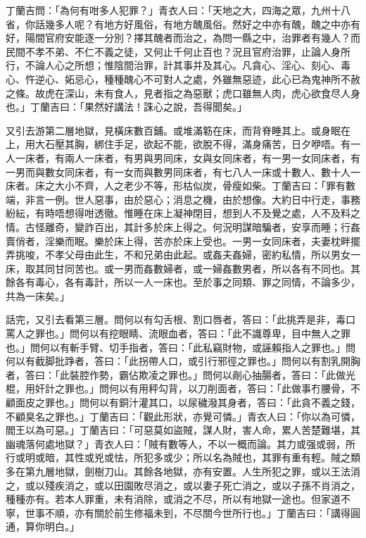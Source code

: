 \documentclass[a5paper, 12pt, openany]{book} %
\begin{document}
	丁蘭吉問：「為何有咁多人犯罪？」青衣人曰：「天地之大，四海之眾，九州十八省，你話幾多人呢？有地方好風俗，有地方醜風俗。然好之中亦有醜，醜之中亦有好，陽間官府安能逐一分別？擇其醜者而治之，為問一縣之中，治罪者有幾人？而民間不孝不弟、不仁不義之徒，又何止千何止百也？況且官府治罪，止論人身所行，不論人心之所想；惟陰間治罪，計其事并及其心。凡貪心、淫心、刻心、毒心、忤逆心、妬忌心，種種醜心不可對人之處，外雖無惡迹，此心已為鬼神所不赦之條。故虎在深山，未有食人，見者指之為惡獸；虎口雖無人肉，虎心欲食尽人身也。」丁蘭吉曰：「果然好講法！誅心之說，吾得聞矣。」

	又引去游第二層地獄，見橫床數百鋪。或堆滿簕在床，而背脊睡其上。或身眠在上，用大石壓其胸，綁住手足，欲起不能，欲脫不得，滿身痛苦，日夕咿唔。有一人一床者，有兩人一床者，有男與男同床，女與女同床者，有一男一女同床者，有一男而與數女同床者，有一女而與數男同床者，有七八人一床或十數人、數十人一床者。床之大小不齊，人之老少不等，形枯似炭，骨瘦如柴。丁蘭吉曰：「罪有數端，非言一例。世人惡事，由於惡心；消息之機，由於想像。大約日中行走，事務紛紜，有時唔想得咁透徹。惟睡在床上凝神閉目，想到人不及覺之處，人不及料之情。古怪離奇，變詐百出，其計多於床上得之。何況明謀暗騙者，安享而睡；行姦賣俏者，淫樂而眠。樂於床上得，苦亦於床上受也。一男一女同床者，夫妻枕畔擺弄挑唆，不孝父母由此生，不和兄弟由此起。或姦夫姦婦，密約私情，所以男女一床，取其同甘同苦也。或一男而姦數婦者，或一婦姦數男者，所以各有不同也。其餘各有毒心，各有毒計，所以一人一床也。至於事之同類、罪之同情，不論多少，共為一床矣。」

	話完，又引去看第三層。問何以有勾舌根、割口唇者，答曰：「此挑弄是非，毒口罵人之罪也。」問何以有挖眼睛、流眼血者，答曰：「此不識尊卑，目中無人之罪也。」問何以有斬手臂、切手指者，答曰：「此私竊財物，或誣賴指人之罪也。」問何以有截脚批踭者，答曰：「此拐帶人口，或引行邪徑之罪也。」問何以有割乳開胸者，答曰：「此裝腔作勢，霸佔欺凌之罪也。」問何以剮心抽腸者，答曰：「此做光棍，用奸計之罪也。」問何以有用秤勾背，以刀削面者，答曰：「此做事冇腰骨，不顧面皮之罪也。」問何以有銅汁灌其口，以尿穢潑其身者，答曰：「此貪不義之錢，不顧臭名之罪也。」丁蘭吉曰：「觀此形狀，亦覺可憐。」青衣人曰：「你以為可憐，閻王以為可惡。」丁蘭吉曰：「可惡莫如盜賊，謀人財，害人命，累人苦楚難堪，其幽魂落何處地獄？」青衣人曰：「賊有數等人，不以一概而論。其力或强或弱，所行或明或暗，其性或兇或怯，所犯多或少；所以名為賊也，其罪有重有輕。賊之類多在第九層地獄，劍樹刀山。其餘各地獄，亦有安置。人生所犯之罪，或以王法消之，或以殘疾消之，或以田園敗尽消之，或以妻子死亡消之，或以子孫不肖消之，種種亦有。若本人罪重，未有消除，或消之不尽，所以有地獄一途也。但家道不寧，世事不順，亦有關於前生修福未到，不尽關今世所行也。」丁蘭吉曰：「講得圓通，算你明白。」
\end{document}
